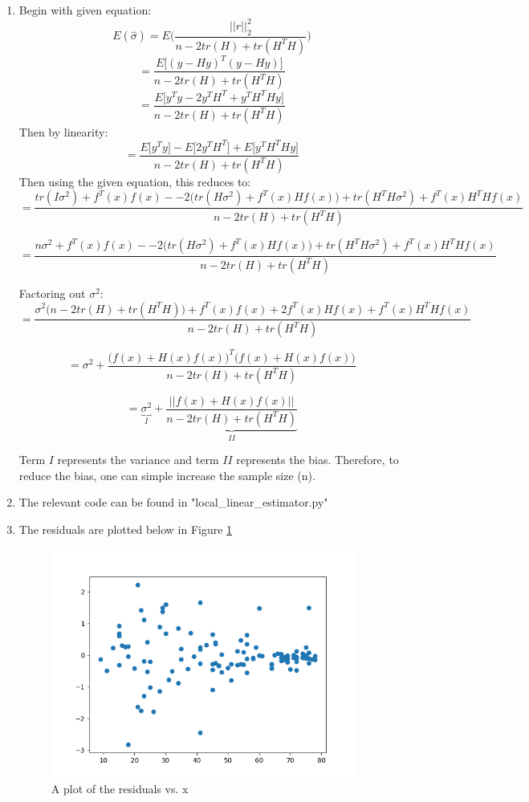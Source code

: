 \documentclass[10pt]{article}
\begin{document}
\begin{enumerate}[label=(\Alph*)]
        \item
        Begin with given equation:
        $$E(\hat{\sigma}) = E\bigg(\frac{||r||_2^2}{n-2tr(H)+tr(H^TH)}\bigg)$$
        $$=\frac{E\bigg[ (y-Hy)^T(y-Hy) \bigg]}{n-2tr(H)+tr(H^TH)}$$
        $$=\frac{E\bigg[y^Ty-2y^TH^T+y^TH^THy\bigg]}{n-2tr(H)+tr(H^TH)}$$
        Then by linearity:
        $$=\frac{E\bigg[y^Ty\bigg]-E\bigg[2y^TH^T\bigg]+E\bigg[y^TH^THy\bigg]}{n-2tr(H)+tr(H^TH)}$$
        Then using the given equation, this reduces to:
        $$=\frac{tr(I\sigma^2)+f^T(x)f(x)--2\bigg(tr(H\sigma^2)+f^T(x)Hf(x)\bigg)+tr(H^TH\sigma^2)+f^T(x)H^THf(x)}{n-2tr(H)+tr(H^TH)}$$

        $$=\frac{n\sigma^2+f^T(x)f(x)--2\bigg(tr(H\sigma^2)+f^T(x)Hf(x)\bigg)+tr(H^TH\sigma^2)+f^T(x)H^THf(x)}{n-2tr(H)+tr(H^TH)}$$

        Factoring out $\sigma^2$:
        $$=\frac{\sigma^2\bigg(n-2tr(H) + tr(H^TH)\bigg) + f^T(x)f(x) +2f^T(x)Hf(x)+f^T(x)H^THf(x)}{n-2tr(H)+tr(H^TH)}$$

        $$=\sigma^2 + \frac{\bigg(f(x)+H(x)f(x)\bigg)^T\bigg(f(x)+H(x)f(x)\bigg)}{n-2tr(H)+tr(H^TH)}$$

        $$=\underbrace{\sigma^2}_{I} + \underbrace{\frac{||f(x)+H(x)f(x)||}{n-2tr(H)+tr(H^TH)}}_{II}$$


        Term $I$ represents the variance and term $II$ represents the bias. Therefore, to reduce the bias, one can simple increase the sample size (n).

        \item
        The relevant code can be found in "local\_linear\_estimator.py"

        \item
     	The residuals are plotted below in Figure \ref{fig:residual_plot}
		\begin{figure}[htb] \centering
		\includegraphics[width=0.95\textwidth]{./residual_plot.png}
		\caption{A plot of the residuals vs. x}
		\label{fig:residual_plot}
		\end{figure}


\end{enumerate}
\end{document}
